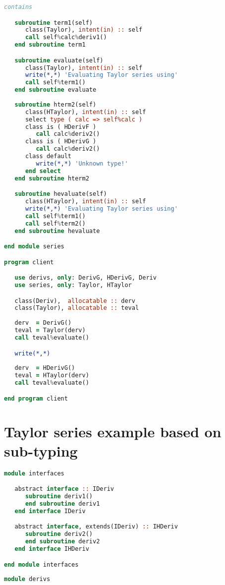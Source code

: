 \documentclass[11pt,oneside]{article}
\begin{document}
\begin{appendices}
\begin{lstlisting}[language=Fortran]
contains

   subroutine term1(self)
      class(Taylor), intent(in) :: self
      call self%calc%deriv1()
   end subroutine term1

   subroutine evaluate(self)
      class(Taylor), intent(in) :: self
      write(*,*) 'Evaluating Taylor series using'
      call self%term1()
   end subroutine evaluate
      
   subroutine hterm2(self)
      class(HTaylor), intent(in) :: self
      select type ( calc => self%calc )
      class is ( HDerivF )
         call calc%deriv2()
      class is ( HDerivG )
         call calc%deriv2()
      class default
         write(*,*) 'Unknown type!'
      end select
   end subroutine hterm2

   subroutine hevaluate(self)
      class(HTaylor), intent(in) :: self
      write(*,*) 'Evaluating Taylor series using'
      call self%term1()
      call self%term2()
   end subroutine hevaluate

end module series

program client

   use derivs, only: DerivG, HDerivG, Deriv
   use series, only: Taylor, HTaylor

   class(Deriv),  allocatable :: derv
   class(Taylor), allocatable :: teval
   
   derv  = DerivG()
   teval = Taylor(derv)   
   call teval%evaluate()   

   write(*,*)
   
   derv  = HDerivG()
   teval = HTaylor(derv)
   call teval%evaluate()   

end program client
\end{lstlisting}


\section{Taylor series example based on sub-typing}
\label{sect:example2}

\begin{lstlisting}[language=Fortran]
module interfaces

   abstract interface :: IDeriv
      subroutine deriv1()
      end subroutine deriv1
   end interface IDeriv

   abstract interface, extends(IDeriv) :: IHDeriv
      subroutine deriv2()
      end subroutine deriv2
   end interface IHDeriv

end module interfaces
   
module derivs


\end{lstlisting}
\end{appendices}
\end{document}
